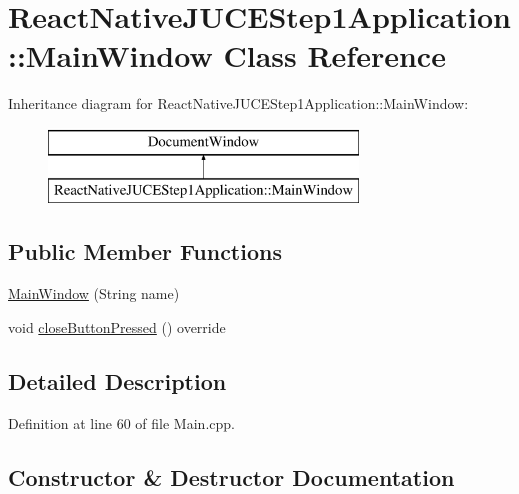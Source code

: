 \hypertarget{class_react_native_j_u_c_e_step1_application_1_1_main_window}{}\section{React\+Native\+J\+U\+C\+E\+Step1\+Application\+:\+:Main\+Window Class Reference}
\label{class_react_native_j_u_c_e_step1_application_1_1_main_window}
Inheritance diagram for React\+Native\+J\+U\+C\+E\+Step1\+Application\+:\+:Main\+Window\+:\begin{figure}[H]
\begin{center}
\leavevmode
\includegraphics[height=2.000000cm]{class_react_native_j_u_c_e_step1_application_1_1_main_window}
\end{center}
\end{figure}
\subsection*{Public Member Functions}
\begin{DoxyCompactItemize}
\item 
\mbox{\hyperlink{class_react_native_j_u_c_e_step1_application_1_1_main_window_a6d5c670ed3502233b2d5265860a148df}{Main\+Window}} (String name)
\item 
void \mbox{\hyperlink{class_react_native_j_u_c_e_step1_application_1_1_main_window_a46285ddeeb829fd29e5498e504c0e615}{close\+Button\+Pressed}} () override
\end{DoxyCompactItemize}


\subsection{Detailed Description}


Definition at line 60 of file Main.\+cpp.



\subsection{Constructor \& Destructor Documentation}
\mbox{\label{class_react_native_j_u_c_e_step1_application_1_1_main_window_a6d5c670ed3502233b2d5265860a148df}} 
